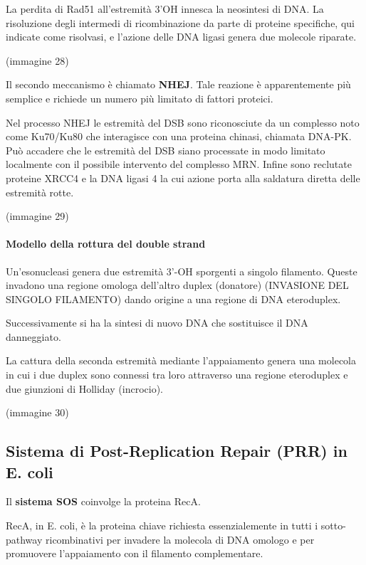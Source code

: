 \documentclass[11pt]{book}
\begin{document}
La perdita di Rad51 all'estremità 3'OH innesca la neosintesi di DNA. La
risoluzione degli intermedi di ricombinazione da parte di proteine
specifiche, qui indicate come risolvasi, e l'azione delle DNA ligasi
genera due molecole riparate.

(immagine 28)

Il secondo meccanismo è chiamato \textbf{NHEJ}. Tale reazione è
apparentemente più semplice e richiede un numero più limitato di fattori
proteici.

Nel processo NHEJ le estremità del DSB sono riconosciute da un complesso
noto come Ku70/Ku80 che interagisce con una proteina chinasi, chiamata
DNA-PK. Può accadere che le estremità del DSB siano processate in modo
limitato localmente con il possibile intervento del complesso MRN.
Infine sono reclutate proteine XRCC4 e la DNA ligasi 4 la cui azione
porta alla saldatura diretta delle estremità rotte.

(immagine 29)

\paragraph{Modello della rottura del double
strand}\label{modello-della-rottura-del-double-strand}

Un'esonucleasi genera due estremità 3'-OH sporgenti a singolo filamento.
Queste invadono una regione omologa dell'altro duplex (donatore)
(INVASIONE DEL SINGOLO FILAMENTO) dando origine a una regione di DNA
eteroduplex.

Successivamente si ha la sintesi di nuovo DNA che sostituisce il DNA
danneggiato.

La cattura della seconda estremità mediante l'appaiamento genera una
molecola in cui i due duplex sono connessi tra loro attraverso una
regione eteroduplex e due giunzioni di Holliday (incrocio).

(immagine 30)

\subsection{Sistema di Post-Replication Repair (PRR) in E.
coli}\label{sistema-di-post-replication-repair-prr-in-e.-coli}

Il \textbf{sistema SOS} coinvolge la proteina RecA.

RecA, in E. coli, è la proteina chiave richiesta essenzialemente in
tutti i sotto-pathway ricombinativi per invadere la molecola di DNA
omologo e per promuovere l'appaiamento con il filamento complementare.
\end{document}
